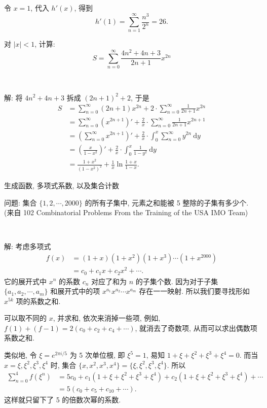令 $x=1$, 代入 $h'(x)$, 得到
\[h'(1) = \sum_{n=1}^{\infty}{\frac{n^3}{2^n}} = 26 .\]


\newpage
对 $|x| < 1$, 计算:
\[S = \sum_{n=0}^{\infty}\frac{4n^2+4n+3}{2n+1}x^{2n}\]

~

解: 将 $4n^2 + 4n + 3$ 拆成 $(2n+1)^2 + 2$, 于是
\begin{align*}
S &= \sum_{n=0}^{\infty}(2n+1)x^{2n} + 2\cdot\sum_{n=0}^{\infty}\frac{1}{2n+1}x^{2n}\\
&= \sum_{n=0}^{\infty}\left(x^{2n+1}\right)' + \frac{2}{x}\cdot\sum_{n=0}^{\infty}\frac{1}{2n+1}x^{2n+1}\\
&= \left(\sum_{n=0}^{\infty}x^{2n+1}\right)' + \frac{2}{x}\cdot\int_0^x\sum_{n=0}^\infty y^{2n}\ \mathrm{d}y \\
&= \left(\frac{x}{1-x^2}\right)' + \frac{2}{x}\cdot\int_0^x\frac{1}{1-y^2}\ \mathrm{d}y\\
&= \frac{1+x^2}{(1-x^2)^2} + \frac{1}{x}\ln\frac{1+x}{1-x} .
\end{align*}



\newpage

\noindent 生成函数, 多项式系数, 以及集合计数

\noindent 问题: 集合 $\{1,2,\cdots ,2000\}$ 的所有子集中, 元素之和能被 5 整除的子集有多少个. (来自 102 Combinatorial Problems From the Training of the USA IMO Team)

~

\noindent 解: 考虑多项式 
\begin{align*}
f(x) &= (1+x)(1+x^2)(1+x^3)\cdots(1+x^{2000}) \\
&= c_0 + c_1x + c_2x^2 + \cdots .
\end{align*}
它的展开式中 $x^n$ 的系数 $c_n$ 对应了和为 $n$ 的子集个数. 因为对于子集 $\{a_1, a_2, \cdots, a_m\}$ 和展开式中的项 $x^{a_1}x^{a_2}\cdots x^{a_m}$ 存在一一映射. 所以我们要寻找形如 $x^{5k}$ 项的系数之和.

可以取不同的 $x$, 并求和, 依次来消掉一些项, 例如, $f(1)+(f-1) = 2(c_0+c_2+c_4+\cdots)$, 就消去了奇数项, 从而可以求出偶数项系数之和.

类似地, 令 $ \xi = e^{2\pi i/5}$ 为 5 次单位根, 即 $\xi^5 = 1$, 易知 $1+\xi+\xi^2+\xi^3+\xi^4=0$. 而当$x = \xi, \xi^2, \xi^3, \xi^4$ 时, 集合 $\{x, x^2, x^3, x^4\} = \{\xi, \xi^2, \xi^3, \xi^4\}$. 所以
\begin{align*}
\sum_{n=0}^4{f(\xi^n)} &= 5c_0 + c_1(1+\xi+\xi^2+\xi^3+\xi^4)+c_2(1+\xi+\xi^2+\xi^3+\xi^4) + \cdots \\
&= 5(c_0+c_5+c_{10} + \cdots ).
\end{align*}
这样就只留下了 5 的倍数次幂的系数.

